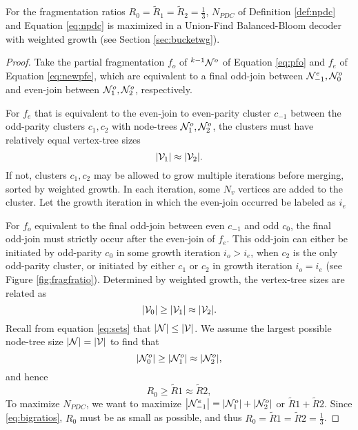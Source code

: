 \begin{theorem}\label{the:fragratio}
  For the fragmentation ratios $R_0 = \tilde{R}_1 = \tilde{R}_2 = \frac{1}{3}$, $N_{PDC}$ of Definition \ref{def:npdc} and Equation \eqref{eq:npdc} is maximized in a Union-Find Balanced-Bloom decoder with weighted growth (see Section \ref{sec:bucketwg}). 
\end{theorem}
\begin{proof}
  Take the partial fragmentation $f_o$ of ${}^{k-1}\mathcal{N}^o$ of Equation \eqref{eq:pfo} and $f_e$ of Equation \eqref{eq:newpfe}, which are equivalent to a final odd-join between $\mathcal{N}^e_{-1}, \mathcal{N}^o_0$ and even-join between $\mathcal{N}^o_1, \mathcal{N}^o_2$, respectively. 
  
  For $f_e$ that is equivalent to the even-join to even-parity cluster $c_{-1}$ between the odd-parity clusters $c_1, c_2$ with node-trees $\mathcal{N}^o_1, \mathcal{N}^o_2$, the clusters must have relatively equal vertex-tree sizes 
  \begin{equation*}
    \abs{\mathcal{V}_1} \approx \abs{\mathcal{V}_2}.
  \end{equation*}
  If not, clusters $c_1, c_2$ may be allowed to grow multiple iterations before merging, sorted by weighted growth. In each iteration, some $N_v$ vertices are added to the cluster. Let the growth iteration in which the even-join occurred be labeled as $i_e$
  
  For $f_o$ equivalent to the final odd-join between even $c_{-1}$ and odd $c_0$, the final odd-join must strictly occur after the even-join of $f_e$. This odd-join can either be initiated by odd-parity $c_0$ in some growth iteration $i_o > i_e$, when $c_2$ is the only odd-parity cluster, or initiated by either $c_1$ or $c_2$ in growth iteration $i_o = i_e$ (see Figure \ref{fig:fragfratio}). Determined by weighted growth, the vertex-tree sizes are related as
  \begin{equation*}
    \abs{\mathcal{V}_0} \geq \abs{\mathcal{V}_1} \approx \abs{\mathcal{V}_2}.
  \end{equation*}
  Recall from equation \eqref{eq:sets} that $|\mathcal{N}| \leq |\mathcal{V}|$. We assume the largest possible node-tree size $|\mathcal{N}| = |\mathcal{V}|$ to find that 
  \begin{equation*}
    \abs{\mathcal{N}^o_0} \geq \abs{\mathcal{N}^o_1} \approx \abs{\mathcal{N}^o_2},
  \end{equation*}
  and hence
  \begin{equation*}
    R_0 \geq \tilde{R}1 \approx \tilde{R}2,
  \end{equation*}
  To maximize $N_{PDC}$, we want to maximize $\abs{\mathcal{N}^e_{-1}} = \abs{\mathcal{N}^o_1} + \abs{\mathcal{N}^o_2}$ or $\tilde{R}1 + \tilde{R}2$. Since \eqref{eq:bigratios}, $R_0$ must be as small as possible, and thus $R_0 = \tilde{R}1 = \tilde{R}2 = \frac{1}{3}$. 
\end{proof}

